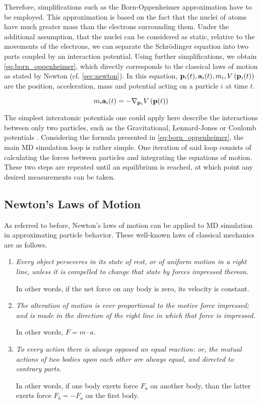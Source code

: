 Therefore, simplifications such as the Born-Oppenheimer approximation have to be employed. This approximation is based on the fact that the nuclei of atoms have much greater mass than the electrons surrounding them. Under the additional assumption, that the nuclei can be considered as static, relative to the movements of the electrons, we can separate the Schrödinger equation into two parts coupled by an interaction potential. Using further simplifications, we obtain \eqref{eq:born_oppenheimer}, which directly corresponds to the classical laws of motion as stated by Newton (cf. \autoref{sec:newton}). In this equation, $\mathbf{p}_i(t), \mathbf{a}_i(t), m_i, V\left(\mathbf{p}_i(t)\right)$ are the position, acceleration, mass and potential acting on a particle $i$ at time $t$. \cite{Born1927, Voorhis2005, Griebel2007} 

\begin{equation}
	m_i\mathbf{a}_i(t) = -\nabla_{\mathbf{p}_i} V\left(\mathbf{p}(t)\right)\label{eq:born_oppenheimer}
\end{equation}

The simplest interatomic potentials one could apply here describe the interactions between only two particles, such as the Gravitational, Lennard-Jones or Coulomb potentials \cite{Griebel2007}.
Considering the formula presented in \eqref{eq:born_oppenheimer}, the main MD simulation loop is rather simple. One iteration of said loop consists of calculating the forces between particles and integrating the equations of motion. These two steps are repeated until an equilibrium is reached, at which point any desired measurements can be taken. \cite{Frenkel2002}





\subsection{Newton's Laws of Motion}
\label{sec:newton}
As referred to before, Newton's laws of motion can be applied to MD simulation in approximating particle behavior. These well-known laws of classical mechanics are as follows. \cite{Newton1934}
\begin{enumerate}[label=\Roman*.]
	\item \textit{Every object perseveres in its state of rest, or of uniform motion in a right line, unless it is compelled to change that state by forces impressed thereon.}

	      In other words, if the net force on any body is zero, its velocity is constant.
	\item \textit{The alteration of motion is ever proportional to the motive force impressed; and is made in the direction of the right line in which that force is impressed.}

	      In other words, $F=m\cdot a$.
	\item \textit{To every action there is always opposed an equal reaction: or, the mutual actions of two bodies upon each other are always equal, and directed to contrary parts.}

	      In other words, if one body exerts force $F_a$ on another body, than the latter exerts force $F_b=-F_a$ on the first body.
\end{enumerate}

